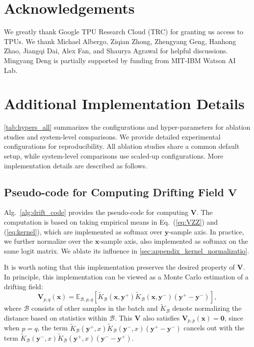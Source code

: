 \documentclass{article}
\newcommand{\vv}[1]{\mathbf{#1}}
\newcommand{\x}{\vv{x}}
\newcommand{\y}{\vv{y}}
\newcommand{\V}{\vv{V}}
\newcommand{\yp}{{\textcolor{blue}{\vv{y}^{+}}}}
\newcommand{\yn}{{\textcolor{orange}{\vv{y}^{-}}}}
\theoremstyle{plain}
\theoremstyle{definition}
\theoremstyle{remark}
\begin{document}
\vfill



\section*{Acknowledgements}
We greatly thank Google TPU Research Cloud (TRC) for granting us access to TPUs. We thank Michael Albergo, Ziqian Zhong, Zhengyang Geng, Hanhong Zhao, Jiangqi Dai, Alex Fan, and Shaurya Agrawal for helpful discussions. Mingyang Deng is partially supported by funding from MIT-IBM Watson AI Lab.






\clearpage
\newpage
\appendix
\section{Additional Implementation Details}
\label{sec:appendix_impl}

\cref{tab:hypers_all} summarizes the configurations and hyper-parameters for ablation studies and system-level comparisons.
We provide detailed experimental configurations for reproducibility. All ablation studies share a common default setup, while system-level comparisons use scaled-up configurations. More implementation details are described as follows.



\subsection{Pseudo-code for Computing Drifting Field $\V$}
\label{sec:appendix_compute_V}

Alg.~\ref{alg:drift_code} provides the pseudo-code for computing $\V$. The computation is based on taking empirical means in Eq.~(\ref{eq:VZZ}) and (\ref{eq:kernel}), which are implemented as softmax over $\y$-sample axis. In practice, we further normalize over the $\x$-sample axis, also implemented as softmax on the same logit matrix.
We ablate its influence in \ref{sec:appendix_kernel_normalizatio}.

\renewcommand{\yn}{\y^{-}}
\renewcommand{\yp}{\y^{+}}
\newcommand{\B}{\mathcal{B}}

It is worth noting that this implementation preserves the desired property of $\V$.
In principle, this implementation can be viewed as a Monte Carlo estimation of a drifting field:
\begin{equation}
\V_{p,q}(\x)=\mathbb E_{\B,p,q}[\tilde K_\B(\x, \yp)\tilde K_\B(\x, \yn)(\yp-\yn)],
\end{equation}
where $\B$ consists of other samples in the batch and $\tilde K_\B$ denote normalizing the distance based on statistics within $\B$. This $\V$ also satisfies $\V_{p,p}(\x)=\mathbf 0$, since when $p=q$, the term  $\tilde K_\B(\yp, x)\tilde K_\B(\yn,x)(\yp-\yn)$ cancels out with the term $\tilde K_\B(\yn, x)\tilde K_\B(\yp,x)(\yn-\yp)$.
\end{document}
